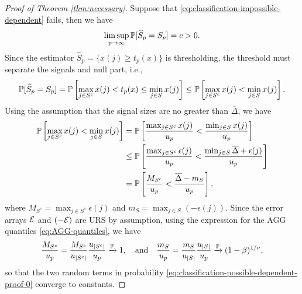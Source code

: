 \begin{proof} [Proof of Theorem \ref{thm:necessary}]
Suppose that \eqref{eq:classification-impossible-dependent} fails, then we have
\begin{equation} \label{eq:classification-possible-dependent}
    \limsup_{p\to\infty}\P[\widehat{S}_p = S_p] = c > 0. 
\end{equation}
Since the estimator $\widehat{S}_p = \{x(j) \ge t_p(x)\}$ is thresholding, the threshold must separate the signals and null part, i.e.,
\begin{equation*}
    \P[\widehat{S}_p = S_p] 
    = \P\left[\max_{j\in S^c}x(j) < t_p(x) \le \min_{j\in S}x(j)\right]
    \le \P\left[\max_{j\in S^c}x(j) < \min_{j\in S}x(j)\right].
\end{equation*}
Using the assumption that the signal sizes are no greater than $\overline{\Delta}$, we have
\begin{align}
\P\left[\max_{j\in S^c}x(j) < \min_{j\in S}x(j)\right]  
  &= \P\left[\frac{\max_{j\in S^c}x(j)}{u_p} < \frac{\min_{j\in S}x(j)}{u_p}\right] \nonumber \\
  &\le  \P\left[\frac{\max_{j\in S^c}\epsilon(j)}{u_p} < \frac{\min_{j\in S}\overline{\Delta} + \epsilon(j)}{u_p}\right] \nonumber \\
  &= \P\left[ \frac{M_{S^c}}{u_p} < \frac{\overline{\Delta} - m_S}{u_p} \right], \label{eq:classification-possible-dependent-proof-0}
\end{align}
where $M_{S^c} = \max_{j\in S^c}\epsilon(j)$ and $m_{S} = \max_{j\in S}\left(-\epsilon(j)\right)$.
Since the error arrays ${\cal E}$ and $(-{\cal E})$ are URS by assumption, using the expression for the AGG quantiles \eqref{eq:AGG-quantiles}, we have
\begin{equation} \label{eq:classification-possible-dependent-proof-1}
    \frac{M_{S^c}}{u_p} = \frac{M_{S^c}}{u_{|S^c|}} \frac{u_{|S^c|}}{u_p} \xrightarrow{\P} 1,
\quad \text{and} \quad
\frac{m_{S}}{u_p} = \frac{m_{S}}{u_{|S|}} \frac{u_{|S|}}{u_p} \xrightarrow{\P} (1-\beta)^{1/\nu},
\end{equation}
so that the two random terms in probability \eqref{eq:classification-possible-dependent-proof-0} converge to constants.


\end{proof}
